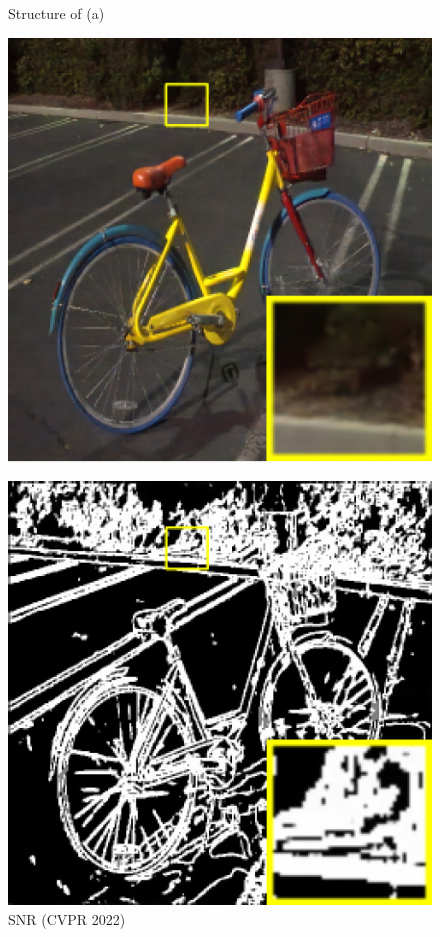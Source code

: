 \documentclass[CJK,aspectratio=169]{beamer}  %
\begin{document}
\begin{frame}
\begin{figure}
\begin{minipage}{.25\textwidth}
				\captionsetup{font=scriptsize}
				\label{fig: Structure of (a)}	
				\caption*{Structure of (a)}
			\end{minipage}
			\begin{minipage}{.25\textwidth}
				\centering
				\includegraphics[width=.8\linewidth]{picture/LLIE/Structure Modeling and Guidance/SNR (CVPR 2022)}
				\captionsetup{font=scriptsize}
				\label{fig: SNR (CVPR 2022)}	
				\caption*{SNR (CVPR 2022)}
			\end{minipage}
			\begin{minipage}{.25\textwidth}
				\centering
				\includegraphics[width=.8\linewidth]{picture/LLIE/Structure Modeling and Guidance/Structure Modeling}

\end{minipage}
\end{figure}
\end{frame}
\end{document}
